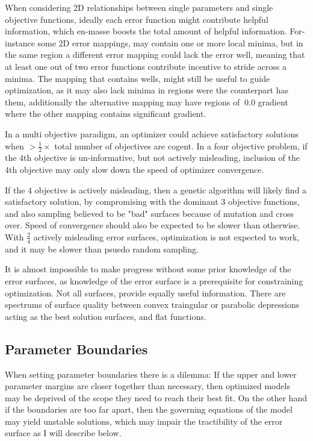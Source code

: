    When considering 2D relationships between single parameters and single objective functions, ideally each error function might contribute helpful information, which en-masse boosts the total amount of helpful information. For-instance some 2D error mappings, may contain one or more local minima, but in the same region a different error mapping could lack the error well, meaning that at least one out of two error functions contribute incentive to stride across a minima. The mapping that contains wells, might still be useful to guide optimization, as it may also lack minima in regions were the counterpart has them, additionally the alternative mapping may have regions of $~0.0$ gradient where the other mapping contains significant gradient.
   
   
   In a multi objective paradigm, an optimizer could achieve satisfactory solutions when $> \frac{1}{2} \times$ total number of objectives are cogent. In a four objective problem, if the $4$th objective is un-informative, but not actively misleading, inclusion of the 4th objective may only slow down the speed of optimizer convergence.
   
   If the $4$ objective is actively misleading, then a genetic algorithm will likely find a satisfactory solution, by compromising with the dominant $3$ objective functions, and also sampling believed to be "bad" surfaces because of mutation and cross over. Speed of convergence should also be expected to be slower than otherwise. With $\frac{2}{4}$ actively misleading error surfaces, optimization is not expected to work, and it may be slower than psuedo random sampling.
   
   
   It is almost impossible to make progress without some prior knowledge of the error surfaces, as knowledge of the error surface is a prerequisite for constraining optimization. Not all surfaces, provide equally useful information. There are spectrums of surface quality between convex traingular or parabolic depressions acting as the best solution surfaces, and flat functions. 
   

\subsection{Parameter Boundaries}
When setting parameter boundaries there is a dilemma: If the upper and lower parameter margins are closer together than necessary, then optimized models may be deprived of the scope they need to reach their best fit. On the other hand if the boundaries are too far apart, then the governing equations of the model may yield unstable solutions, which may impair the tractibility of the error surface as I will describe below.

